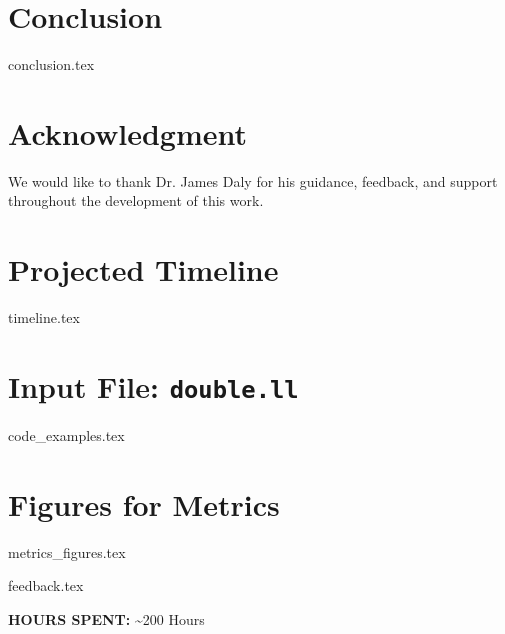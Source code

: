 \documentclass[conference]{IEEEtran}
\begin{document}
\section{Conclusion}
\label{sec:conclusion}
{conclusion.tex}

\section*{Acknowledgment}
We would like to thank Dr. James Daly for his guidance, feedback, and support throughout the development of this work.




\newpage \appendices \onecolumn

\section{Projected Timeline}
\label{app:timeline}
{timeline.tex}

\section{Input File: \texttt{double.ll}}
\label{app:metrics}
{code_examples.tex}

\newpage

\section{Figures for Metrics}
\label{app:metrics_figures}
{metrics_figures.tex}

\label{app:feedback}
{feedback.tex}

\vspace{2em}

\textbf{HOURS SPENT:} \textasciitilde 200 Hours
\end{document}
